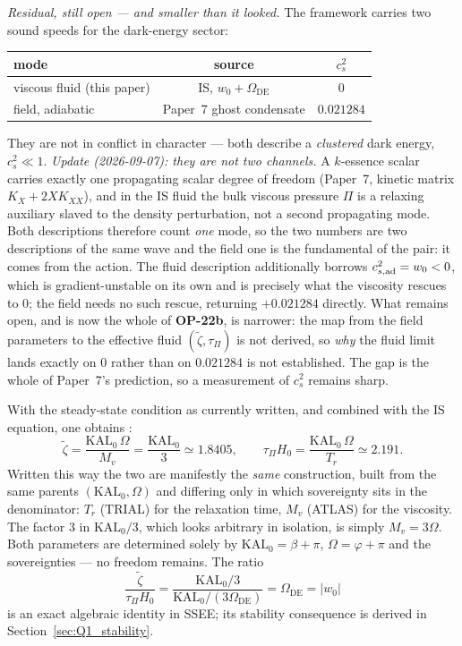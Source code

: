 \documentclass[12pt,a4paper]{article}
\newcommand{\KALz}{\mathrm{KAL}_0}
\newcommand{\wz}{w_0}
\newcommand{\OmDE}{\Omega_{\mathrm{DE}}}
\newcommand{\tauPi}{\tau_\Pi}
\newcommand{\ztilde}{\tilde{\zeta}}
\begin{document}
\begin{tcolorbox}[colback=green!4,colframe=green!45!black,
  title={\textbf{Resolved: the normalisation of $\ztilde$ (OP-22, closed 2026-09-06)}}]
\emph{Residual, still open --- and smaller than it looked.} The framework
carries two sound speeds for the dark-energy sector:
\begin{center}
\begin{tabular}{lcc}
\toprule
mode & source & $c^2_s$ \\
\midrule
viscous fluid (this paper) & IS, $\wz+\OmDE$ & $0$ \\
field, adiabatic & Paper~7 ghost condensate & $0.021284$ \\
\bottomrule
\end{tabular}
\end{center}
They are not in conflict in character --- both describe a \emph{clustered}
dark energy, $c^2_s \ll 1$. \emph{Update (2026-09-07): they are not two
channels.} A $k$-essence scalar carries exactly one propagating scalar degree
of freedom (Paper~7, kinetic matrix $K_X+2XK_{XX}$), and in the IS fluid the
bulk viscous pressure $\Pi$ is a relaxing auxiliary slaved to the density
perturbation, not a second propagating mode. Both descriptions therefore
count \emph{one} mode, so the two numbers are two descriptions of the same
wave and the field one is the fundamental of the pair: it comes from the
action. The fluid description additionally borrows $c^2_{s,\rm ad}=\wz<0$,
which is gradient-unstable on its own and is precisely what the viscosity
rescues to $0$; the field needs no such rescue, returning $+0.021284$
directly. What remains open, and is now the whole of \textbf{OP-22b}, is
narrower: the map from the field parameters to the effective fluid
$(\ztilde,\tauPi)$ is not derived, so \emph{why} the fluid limit lands
exactly on $0$ rather than on $0.021284$ is not established. The gap is the
whole of Paper~7's prediction, so a measurement of $c^2_s$ remains sharp.
\end{tcolorbox}

\noindent With the steady-state condition as currently written, and combined
with the IS equation, one obtains \citep{SSEE_Paper1}:
\begin{equation}
  \boxed{\ztilde = \frac{\KALz\,\Omega}{M_v} = \frac{\KALz}{3} \simeq 1.8405,
  \qquad
  \tauPi H_0 = \frac{\KALz\,\Omega}{T_r} \simeq 2.191.}
  \label{eq:IS_params}
\end{equation}
Written this way the two are manifestly the \emph{same} construction, built
from the same parents $(\KALz,\Omega)$ and differing only in which sovereignty
sits in the denominator: $T_r$ (TRIAL) for the relaxation time, $M_v$ (ATLAS)
for the viscosity. The factor $3$ in $\KALz/3$, which looks arbitrary in
isolation, is simply $M_v = 3\Omega$. Both parameters are determined solely by
$\KALz = \beta+\pi$, $\Omega=\varphi+\pi$ and the sovereignties — no freedom
remains.
The ratio
\begin{equation}
  \frac{\ztilde}{\tauPi H_0} = \frac{\KALz/3}{\KALz/(3\OmDE)} = \OmDE = |\wz|
  \label{eq:ratio_identity}
\end{equation}
is an exact algebraic identity in SSEE; its stability consequence is derived
in Section~\ref{sec:Q1_stability}.
\end{document}
